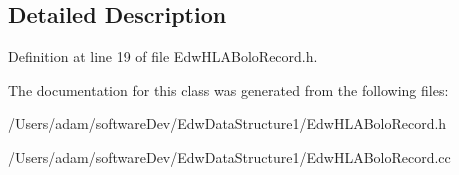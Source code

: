 \subsection{Detailed Description}


Definition at line 19 of file EdwHLABoloRecord.h.



The documentation for this class was generated from the following files:\begin{DoxyCompactItemize}
\item 
/Users/adam/softwareDev/EdwDataStructure1/EdwHLABoloRecord.h\item 
/Users/adam/softwareDev/EdwDataStructure1/EdwHLABoloRecord.cc\end{DoxyCompactItemize}
